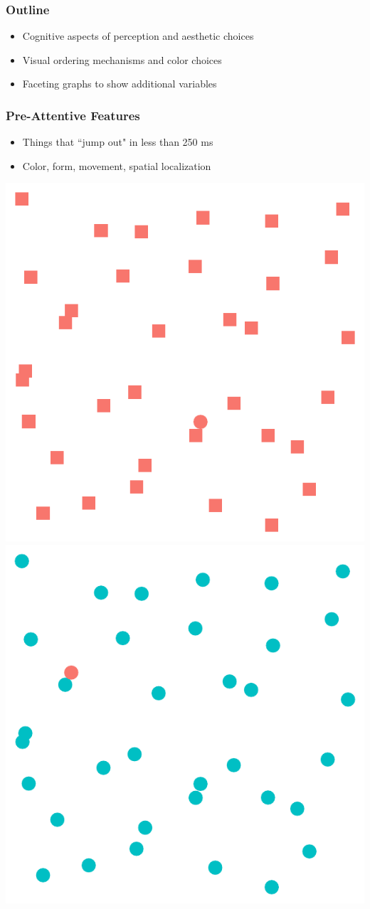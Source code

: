\documentclass{beamer}\usepackage[]{graphicx}\usepackage[]{color}
\begin{document}
\begin{frame}
\frametitle{Outline}
\begin{itemize}
\item Cognitive aspects of perception and aesthetic choices\bigskip
\item Visual ordering mechanisms and color choices\bigskip
\item Faceting graphs to show additional variables\bigskip
\end{itemize}
\end{frame}


\begin{frame}
\frametitle{Pre-Attentive Features}
\begin{itemize}
\item Things that ``jump out" in less than 250 ms\medskip
\item Color, form, movement, spatial localization
\end{itemize}
\hfil\includegraphics[width=.4\linewidth]{figure/preattentive11}\hspace{20pt}
\includegraphics[width=.4\linewidth]{figure/preattentive12}
\end{frame}

\end{document}
